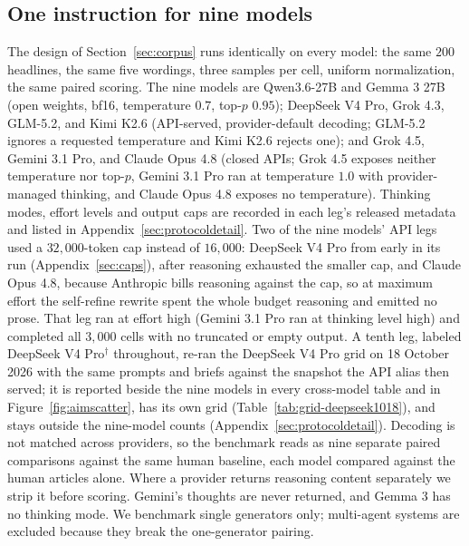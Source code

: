 \documentclass{article}
\begin{document}
\subsection{One instruction for nine models}
\label{sec:ninefam}
The design of Section~\ref{sec:corpus} runs identically on every model: the same $200$ headlines,
the same five wordings, three samples per cell, uniform normalization, the same paired scoring.
The nine models are Qwen3.6-27B and Gemma 3 27B (open weights, bf16, temperature $0.7$, top-$p$ $0.95$);
DeepSeek V4 Pro, Grok 4.3, GLM-5.2, and Kimi K2.6 (API-served, provider-default decoding; GLM-5.2
ignores a requested temperature and Kimi K2.6 rejects one); and Grok 4.5, Gemini 3.1 Pro, and
Claude Opus 4.8 (closed APIs; Grok 4.5 exposes neither temperature nor top-$p$, Gemini 3.1 Pro ran
at temperature $1.0$ with provider-managed thinking, and Claude Opus 4.8 exposes no temperature).
Thinking modes, effort levels and output caps are recorded in each leg's released metadata and
listed in Appendix~\ref{sec:protocoldetail}. Two of the nine models' API legs used a $32{,}000$-token cap instead of
$16{,}000$: DeepSeek V4 Pro from early in its run (Appendix~\ref{sec:caps}), after reasoning exhausted the smaller cap, and Claude Opus 4.8,
because Anthropic bills reasoning against the cap, so at maximum effort the self-refine rewrite
spent the whole budget reasoning and emitted no prose. That leg ran at effort high (Gemini 3.1
Pro ran at thinking level high) and completed all $3{,}000$ cells with no truncated or empty
output. A tenth leg, labeled DeepSeek V4 Pro$^{\dagger}$ throughout, re-ran the DeepSeek V4 Pro grid on 18 October
2026 with the same prompts and briefs against the snapshot the API alias then served; it is
reported beside the nine models in every cross-model table and in Figure~\ref{fig:aimscatter},
has its own grid (Table~\ref{tab:grid-deepseek1018}), and stays outside the nine-model counts
(Appendix~\ref{sec:protocoldetail}).
Decoding is not matched across providers, so the benchmark reads as nine separate paired
comparisons against the same human baseline, each model compared against the human articles
alone. Where a provider returns reasoning content separately
we strip it before scoring. Gemini's thoughts are never returned, and Gemma 3 has no thinking mode.
We benchmark single generators only; multi-agent systems are excluded because they break the
one-generator pairing.
\end{document}
